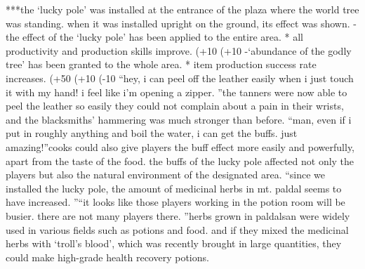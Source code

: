 ***the ‘lucky pole’ was installed at the entrance of the plaza where the world tree was standing.
 when it was installed upright on the ground, its effect was shown.
-the effect of the ‘lucky pole’ has been applied to the entire area.
* all productivity and production skills improve.
 (+10%
 (+10%
-‘abundance of the godly tree’ has been granted to the whole area.
* item production success rate increases.
 (+50%
 (+10%
 (-10%
“hey, i can peel off the leather easily when i just touch it with my hand! i feel like i’m opening a zipper.
”the tanners were now able to peel the leather so easily they could not complain about a pain in their wrists, and the blacksmiths’ hammering was much stronger than before.
“man, even if i put in roughly anything and boil the water, i can get the buffs.
 just amazing!”cooks could also give players the buff effect more easily and powerfully, apart from the taste of the food.
the buffs of the lucky pole affected not only the players but also the natural environment of the designated area.
“since we installed the lucky pole, the amount of medicinal herbs in mt.
 paldal seems to have increased.
”“it looks like those players working in the potion room will be busier.
 there are not many players there.
”herbs grown in paldalsan were widely used in various fields such as potions and food.
and if they mixed the medicinal herbs with ‘troll’s blood’, which was recently brought in large quantities, they could make high-grade health recovery potions.


